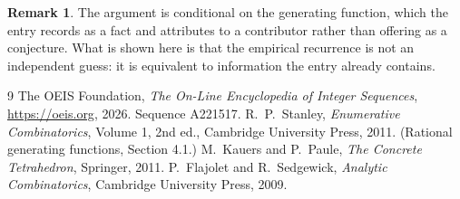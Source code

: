 \documentclass[11pt,a4paper]{article}
\theoremstyle{plain}
\theoremstyle{definition}
\newtheorem{remark}[theorem]{Remark}
\begin{document}
\begin{remark}
The argument is conditional on the generating function, which the entry records as a fact and
attributes to a contributor rather than offering as a conjecture. What is shown here is that
the empirical recurrence is not an independent guess: it is equivalent to information the
entry already contains.
\end{remark}

\begin{thebibliography}{9}
 The OEIS Foundation, \emph{The On-Line Encyclopedia of Integer
Sequences}, \url{https://oeis.org}, 2026. Sequence A221517.
 R.~P.~Stanley, \emph{Enumerative Combinatorics}, Volume 1, 2nd ed.,
Cambridge University Press, 2011. (Rational generating functions, Section 4.1.)
 M.~Kauers and P.~Paule, \emph{The Concrete Tetrahedron}, Springer, 2011.
 P.~Flajolet and R.~Sedgewick, \emph{Analytic Combinatorics}, Cambridge
University Press, 2009.
\end{thebibliography}
\end{document}
